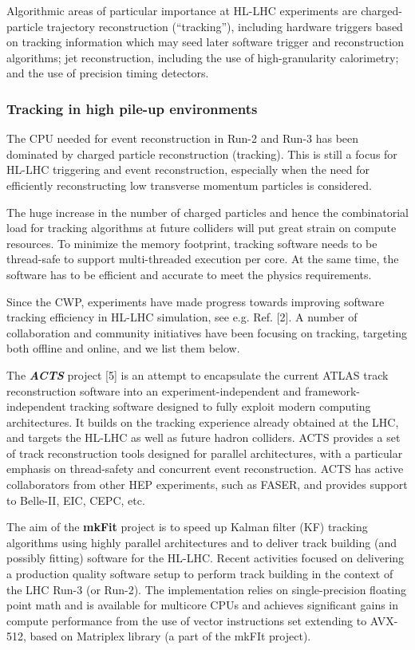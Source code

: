 \documentclass[10pt,a4paper]{article}
\begin{document}
Algorithmic areas of particular importance at HL-LHC experiments are
charged-particle trajectory reconstruction (``tracking''), including
hardware triggers based on tracking information which may seed later
software trigger and reconstruction algorithms; jet reconstruction,
including the use of high-granularity calorimetry; and the use of
precision timing detectors.

\hypertarget{tracking-in-high-pile-up-environments}{%
\subsubsection{Tracking in high pile-up
environments}\label{tracking-in-high-pile-up-environments}}

The CPU needed for event reconstruction in Run-2 and Run-3 has been
dominated by charged particle reconstruction (tracking). This is still a
focus for HL-LHC triggering and event reconstruction, especially when
the need for efficiently reconstructing low transverse momentum
particles is considered.

The huge increase in the number of charged particles and hence the
combinatorial load for tracking algorithms at future colliders will put
great strain on compute resources. To minimize the memory footprint,
tracking software needs to be thread-safe to support multi-threaded
execution per core. At the same time, the software has to be efficient
and accurate to meet the physics requirements.

Since the CWP, experiments have made progress towards improving software
tracking efficiency in HL-LHC simulation, see e.g. Ref. {[}2{]}. A
number of collaboration and community initiatives have been focusing on
tracking, targeting both offline and online, and we list them below.

The \emph{\textbf{ACTS}} project {[}5{]} is an attempt to encapsulate
the current ATLAS track reconstruction software into an
experiment-independent and framework-independent tracking software
designed to fully exploit modern computing architectures. It builds on
the tracking experience already obtained at the LHC, and targets the
HL-LHC as well as future hadron colliders. ACTS provides a set of track
reconstruction tools designed for parallel architectures, with a
particular emphasis on thread-safety and concurrent event
reconstruction. ACTS has active collaborators from other HEP
experiments, such as FASER, and provides support to Belle-II, EIC, CEPC,
etc.

The aim of the \textbf{mkFit} project is to speed up Kalman filter (KF)
tracking algorithms using highly parallel architectures and to deliver
track building (and possibly fitting) software for the HL-LHC. Recent
activities focused on delivering a production quality software setup to
perform track building in the context of the LHC Run-3 (or Run-2). The
implementation relies on single-precision floating point math and is
available for multicore CPUs and achieves significant gains in compute
performance from the use of vector instructions set extending to
AVX-512, based on Matriplex library (a part of the mkFIt project).
\end{document}
